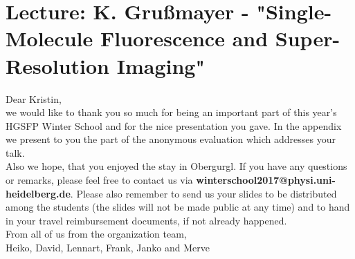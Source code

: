 \documentclass[11pt,a4paper]{article}
\begin{document}
\section*{Lecture: K. Gru{\ss}mayer - "Single-Molecule Fluorescence and Super-Resolution Imaging"}

Dear Kristin,\\
we would like to thank you so much for being an important part of this year's HGSFP Winter School and for the nice presentation you gave.
In the appendix we present to you the part of the anonymous evaluation which addresses your talk.\\
Also we hope, that you enjoyed the stay in Obergurgl. If you have any questions or remarks, please feel free to contact us via \textbf{winterschool2017@physi.uni-heidelberg.de}. Please also remember to send us your slides to be distributed among the students (the slides will not be made public at any time) and to hand in your travel reimbursement documents, if not already happened.\\
From all of us from the organization team,\\
Heiko, David, Lennart, Frank, Janko and Merve
\end{document}
